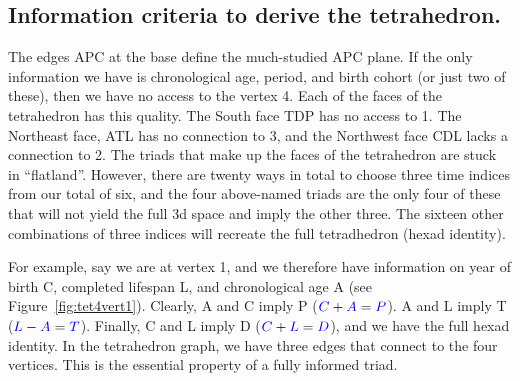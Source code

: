 \documentclass[11pt,oneside,a4paper]{article} %
\newcommand\vt[1]{\textcolor{rd}{#1}}
\newcommand\eg[1]{\textcolor{bl}{#1}}
\begin{document}
\subsection*{Information criteria to derive the tetrahedron.}
The edges \eg{APC} at the base define the much-studied \eg{APC} plane. If the only
information we have is chronological age, period, and birth cohort (or just two
of these), then we have no access to the vertex \vt{4}. Each of the faces of the
tetrahedron has this quality. The South face \eg{TDP} has no access to \vt{1}.
The Northeast face, \eg{ATL} has no connection to \vt{3}, and the Northwest face
\eg{CDL} lacks a connection to \vt{2}. The triads that make up the faces of
the tetrahedron are stuck in ``flatland''. However, there are twenty ways in
total to choose three time indices from our total of six, and the four
above-named triads are the only four of these that will not yield the full 3d
space and imply the other three. The sixteen other combinations of three indices will recreate the full tetradhedron (hexad identity).

For example, say we are at vertex \vt{1}, and we therefore have
information on year of birth \eg{C}, completed lifespan \eg{L}, and
chronological age \eg{A} (see Figure~\ref{fig:tet4vert1}). Clearly, \eg{A} and
\eg{C} imply \eg{P} ($\eg{C}+\eg{A}=\eg{P}$).
\eg{A} and \eg{L} imply \eg{T} ($\eg{L}-\eg{A}=\eg{T}$). Finally, \eg{C} and
\eg{L} imply \eg{D} ($\eg{C}+\eg{L}=\eg{D}$), and we have the full hexad
identity. In the tetrahedron graph, we have three edges that connect to the
four vertices. This is the essential property of a fully informed triad.
\end{document}
